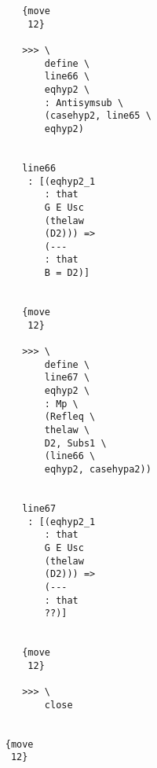 \documentclass[12pt]{article}
\begin{document}
\begin{verbatim}
                                       {move 
                                        12}

                                       >>> \
                                           define \
                                           line66 \
                                           eqhyp2 \
                                           : Antisymsub \
                                           (casehyp2, line65 \
                                           eqhyp2)


                                       line66 
                                        : [(eqhyp2_1 
                                           : that 
                                           G E Usc 
                                           (thelaw 
                                           (D2))) => 
                                           (--- 
                                           : that 
                                           B = D2)]


                                       {move 
                                        12}

                                       >>> \
                                           define \
                                           line67 \
                                           eqhyp2 \
                                           : Mp \
                                           (Refleq \
                                           thelaw \
                                           D2, Subs1 \
                                           (line66 \
                                           eqhyp2, casehypa2))


                                       line67 
                                        : [(eqhyp2_1 
                                           : that 
                                           G E Usc 
                                           (thelaw 
                                           (D2))) => 
                                           (--- 
                                           : that 
                                           ??)]


                                       {move 
                                        12}

                                       >>> \
                                           close


                                    {move 
                                     12}


\end{verbatim}
\end{document}
